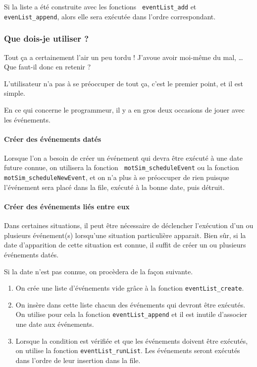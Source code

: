    Si la liste a été construite avec les fonctions {\tt
eventList\_add} et {\tt evenList\_append}, alors elle sera exécutée
dans l'ordre correspondant.

%
\subsubsection{Que dois-je utiliser ?}

   Tout ça a certainement l'air un peu tordu ! J'avoue avoir moi-même
du mal, \ldots Que faut-il donc en retenir ?

   L'utilisateur n'a pas à se préoccuper de tout ça, c'est le premier
point, et il est simple.

   En ce qui concerne le programmeur, il y a en gros deux occasions de
jouer avec les événements.

%
%
%
\paragraph{Créer des événements datés}

   Lorsque l'on a besoin de créer un événement qui devra être exécuté
à une date future connue, on utilisera la fonction {\tt
  motSim\_scheduleEvent} ou la fonction {\tt
  motSim\_scheduleNewEvent}, et on n'a plus à se préoccuper de rien
puisque l'événement sera placé dans la file, exécuté à la bonne date,
puis détruit. 

%
%
%
\paragraph{Créer des événements liés entre eux}

   Dans certaines situations, il peut être nécessaire de déclencher
l'exécution d'un ou plusieurs événement(s) lorsqu'une situation
particulière apparait. Bien sûr, si la date d'apparition de cette
situation est connue, il suffit de créer un ou plusieurs événements
datés.

   Si la date n'est pas connue, on procèdera de la façon suivante.

\begin{enumerate}
   \item On crée une liste d'événements vide grâce à la fonction
     \lstinline!eventList_create!.
   \item On insère dans cette liste chacun des événements qui devront
     être exécutés. On utilise pour cela la fonction
     \lstinline!eventList_append! et il est inutile d'associer une date
     aux événements. 
   \item Lorsque la condition est vérifiée et que les événements
     doivent être exécutés, on utilise la fonction
     \lstinline!eventList_runList!. Les événements seront exécutés
     dans l'ordre de leur insertion dans la file.
\end{enumerate}

